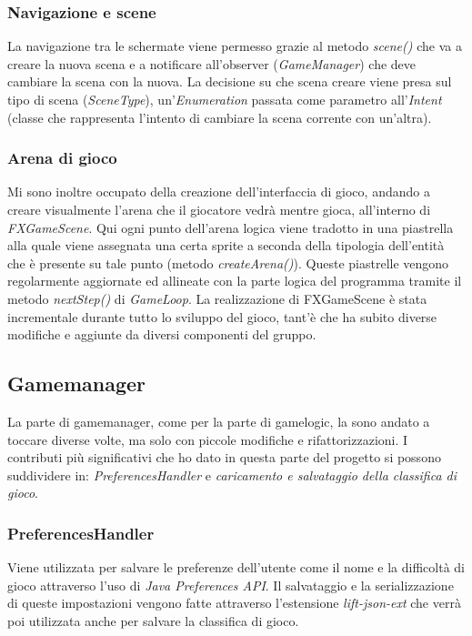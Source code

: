 \subsubsection{Navigazione e scene}
La navigazione tra le schermate viene permesso grazie al metodo \textit{scene\textunderscore()} che va a creare la nuova scena e a notificare all'observer (\textit{GameManager}) che deve cambiare la scena con la nuova.
La decisione su che scena creare viene presa sul tipo di scena (\textit{SceneType}), un'\textit{Enumeration} passata come parametro all'\textit{Intent} (classe che rappresenta l'intento di cambiare la scena corrente con un'altra).

\subsubsection{Arena di gioco}
Mi sono inoltre occupato della creazione dell'interfaccia di gioco, andando a creare visualmente l'arena che il giocatore vedrà mentre gioca, all'interno di \textit{FXGameScene}.
Qui ogni punto dell'arena logica viene tradotto in una piastrella alla quale viene assegnata una certa sprite a seconda della tipologia dell'entità che è presente su tale punto (metodo \textit{createArena()}).
Queste piastrelle vengono regolarmente aggiornate ed allineate con la parte logica del programma tramite il metodo \textit{nextStep()} di \textit{GameLoop}.
La realizzazione di FXGameScene è stata incrementale durante tutto lo sviluppo del gioco, tant'è che ha subito diverse modifiche e aggiunte da diversi componenti del gruppo.

\subsection{Gamemanager}
La parte di gamemanager, come per la parte di gamelogic, la sono andato a toccare diverse volte, ma solo con piccole modifiche e rifattorizzazioni.
I contributi più significativi che ho dato in questa parte del progetto si possono suddividere in: \textit{PreferencesHandler} e \textit{caricamento e salvataggio della classifica di gioco}.

\subsubsection{PreferencesHandler}
Viene utilizzata per salvare le preferenze dell'utente come il nome e la difficoltà di gioco attraverso l'uso di \textit{Java Preferences API}.
Il salvataggio e la serializzazione di queste impostazioni vengono fatte attraverso l'estensione \textit{lift-json-ext} che verrà poi utilizzata anche per salvare la classifica di gioco.

